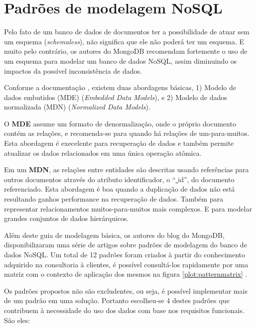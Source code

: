 \documentclass[
	12pt,				%
	openright,			%
	oneside,			%
	a4paper,			%
	english,			%
	french,				%
	spanish,			%
	brazil,				%
	]{abntex2}
\newcommand{\under}{\underline{ }}
\begin{document}
\section{Padrões de modelagem NoSQL}
Pelo fato de um banco de dados de documentos ter a possibilidade de atuar sem um esquema (\textit{schemaless}), não significa que ele não poderá ter um esquema. E muito pelo contrário, os autores do MongoDB recomendam fortemente o uso de um esquema para modelar um banco de dados NoSQL, assim diminuindo os impactos da possível inconsistência de dados. 

Conforme a documentação \cite{mongodocs}, existem duas abordagens básicas, 1) Modelo de dados embutidos (MDE) (\textit{Embedded Data Models}), e 2) Modelo de dados normalizada (MDN) (\textit{Normalized Data Models}).

O \textbf{MDE} assume um formato de denormalização, onde o próprio documento contém as relações, e recomenda-se para quando há relações de um-para-muitos. Esta abordagem é execelente para recuperação de dados e também permite atualizar os dados relacionados em uma única operação atômica.

Em um \textbf{MDN}, as relações entre entidades são descritas usando referências para outros documentos através do atributo identificador, o ``{\under}id'', do documento referenciado. Esta abordagem é boa quando a duplicação de dados não está resultando ganhos performance na recuperação de dados. Também para representar relacionamentos muitos-para-muitos mais complexos. E para modelar grandes conjuntos de dados hierárquicos.

Além deste guia de modelagem básica, os autores do blog do MongoDB, disponibilizaram uma série de artigos sobre padrões de modelagem do banco de dados NoSQL. Um total de 12 padrões foram criados à partir do conhecimento adquirido na consultoria à clientes, é possível consultá-los rapidamente por uma matriz com o contexto de aplicação dos mesmos na figura \ref{plot:patternmatrix} \cite{mongoblogpatterns}.

Os padrões propostos não são excludentes, ou seja, é possível implementar mais de um padrão em uma solução. Portanto escolheu-se 4 destes padrões que contribuem à necessidade do uso dos dados com base nos requisitos funcionais. São eles:
\end{document}
